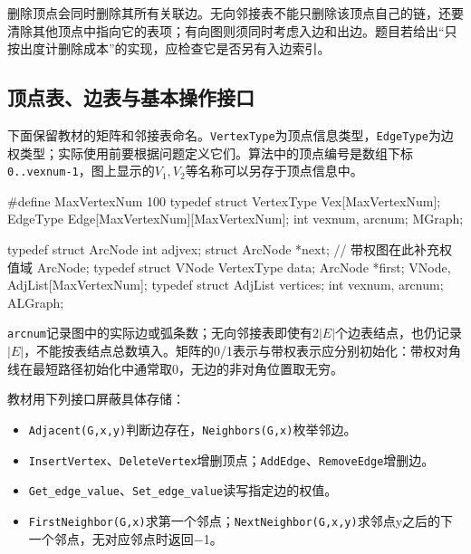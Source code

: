 删除顶点会同时删除其所有关联边。无向邻接表不能只删除该顶点自己的链，还要清除其他顶点中指向它的表项；有向图则须同时考虑入边和出边。题目若给出``只按出度计删除成本''的实现，应检查它是否另有入边索引。

\subsection{顶点表、边表与基本操作接口}\label{DS06-storage-code}

下面保留教材的矩阵和邻接表命名。\texttt{VertexType}为顶点信息类型，\texttt{EdgeType}为边权类型；实际使用前要根据问题定义它们。算法中的顶点编号是数组下标\texttt{0.\allowbreak{}.\allowbreak{}vexnum-1}，图上显示的\(V_1,V_2\)等名称可以另存于顶点信息中。

\par\medskip\noindent\begin{minipage}{\linewidth}
\begin{codeblock}[language=C++]
#define MaxVertexNum 100
typedef struct {
    VertexType Vex[MaxVertexNum];
    EdgeType Edge[MaxVertexNum][MaxVertexNum];
    int vexnum, arcnum;
} MGraph;

typedef struct ArcNode {
    int adjvex;
    struct ArcNode *next;
    // 带权图在此补充权值域
} ArcNode;
typedef struct VNode {
    VertexType data;
    ArcNode *first;
} VNode, AdjList[MaxVertexNum];
typedef struct {
    AdjList vertices;
    int vexnum, arcnum;
} ALGraph;
\end{codeblock}
\end{minipage}\par\medskip

\texttt{arcnum}记录图中的实际边或弧条数；无向邻接表即使有\(2|E|\)个边表结点，也仍记录\(|E|\)，不能按表结点总数填入。矩阵的0/1表示与带权表示应分别初始化：带权对角线在最短路径初始化中通常取0，无边的非对角位置取无穷。

教材用下列接口屏蔽具体存储：

\begin{itemize}
\tightlist
\item
  \texttt{Adjacent(\allowbreak{}G,\allowbreak{}x,\allowbreak{}y)\allowbreak{}}判断边存在，\texttt{Neighbors(\allowbreak{}G,\allowbreak{}x)\allowbreak{}}枚举邻边。
\item
  \texttt{InsertVertex}、\texttt{DeleteVertex}增删顶点；\texttt{AddEdge}、\texttt{RemoveEdge}增删边。
\item
  \texttt{Get\_edge\_value}、\texttt{Set\_edge\_value}读写指定边的权值。
\item
  \texttt{FirstNeighbor(\allowbreak{}G,\allowbreak{}x)\allowbreak{}}求第一个邻点；\texttt{NextNeighbor(\allowbreak{}G,\allowbreak{}x,\allowbreak{}y)\allowbreak{}}求邻点y之后的下一个邻点，无对应邻点时返回\ensuremath{-}1。
\end{itemize}

